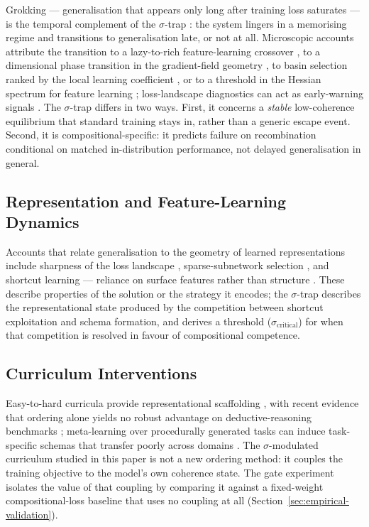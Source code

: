 \documentclass{article}
\theoremstyle{definition}
\begin{document}
Grokking --- generalisation that appears only long after training loss
saturates --- is the temporal complement of the $\sigma$-trap
\citep{liu2022grokking}: the system lingers in a memorising regime and
transitions to generalisation late, or not at all. Microscopic accounts
attribute the transition to a lazy-to-rich feature-learning crossover
\citep{kumar2023grokkingeffectivetheory}, to a dimensional phase
transition in the gradient-field geometry
\citep{wang2026grokkingdimensionalphase}, to basin selection ranked by
the local learning coefficient
\citep{cullen2026basinselectiongrokking}, or to a threshold in the
Hessian spectrum for feature learning \citep{montanari2026}; loss-landscape
diagnostics can act as early-warning signals \citep{xu2026earlywarning}.
The $\sigma$-trap differs in two ways. First, it concerns a
\emph{stable} low-coherence equilibrium that standard training stays
in, rather than a generic escape event. Second, it is
compositional-specific: it predicts failure on recombination
conditional on matched in-distribution performance, not delayed
generalisation in general.

\subsection{Representation and Feature-Learning Dynamics}\label{sec:repr-dynamics}

Accounts that relate generalisation to the geometry of learned
representations include sharpness of the loss landscape
\citep{foret2021sharpnessawareminimization}, sparse-subnetwork
selection \citep{frankle2019lotteryticket}, and shortcut learning ---
reliance on surface features rather than structure
\citep{geirhos2020shortcutlearning}. These describe properties of the
solution or the strategy it encodes; the $\sigma$-trap describes the
representational state produced by the competition between shortcut
exploitation and schema formation, and derives a threshold
($\sigma_{\text{critical}}$) for when that competition is resolved in
favour of compositional competence.

\subsection{Curriculum Interventions}\label{sec:curriculum}

Easy-to-hard curricula provide representational scaffolding
\citep{bengio2009curriculumlearning,kumar2010selfpacedlearning,
portelas2020automaticcurriculumlearningdeep,narvekar2020curriculumlearningreinforcementlearning},
with recent evidence that ordering alone yields no robust advantage on
deductive-reasoning benchmarks \citep{mordig2026rethinkingeasytohard};
meta-learning over procedurally generated tasks can induce task-specific
schemas that transfer poorly across domains
\citep{mondorf2026compositionalarc}. The $\sigma$-modulated curriculum
studied in this paper is not a new ordering method: it couples the
training objective to the model's own coherence state. The gate
experiment isolates the value of that coupling by comparing it against
a fixed-weight compositional-loss baseline that uses no coupling at all
(Section~\ref{sec:empirical-validation}).
\end{document}
